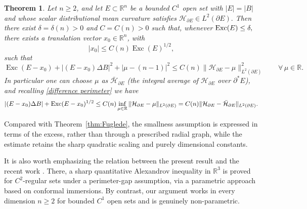\documentclass[reqno,11pt]{amsart}
\newcommand{\R}{\mathbb R}
\newtheorem{thm}{Theorem}[section]
\numberwithin{equation}{section}
\theoremstyle{remark}
\begin{document}
\begin{thm}\label{main thm}
Let $n \geq 2$, and let $E\subset \mathbb R^n$ be a bounded $C^1$ open set with $|E|=|B|$ and whose scalar distributional
mean curvature satisfies $\mathcal H_{\partial E}\in L^2(\partial E).$ Then there exist $\delta=\delta(n)>0$ and $C=C(n)>0$ such that, whenever
${\rm Exc}(E) \leq \delta,$
there exists a translation vector $x_0\in\R^n$, with
$$
|x_0|\le C(n)\operatorname{Exc}(E)^{1/2},
$$
such that
\begin{equation}
\label{eq:main thm}
\operatorname{Exc}(E-x_0)+|(E-x_0)\Delta B|^2+|\mu-(n-1)|^2
\le C(n) \|\mathcal H_{\partial E}-\mu\|^2_{L^2(\partial E)} \qquad \forall\,\mu \in \R.
\end{equation}
In particular  one can choose $\mu$ as $\bar {\mathcal H}_{\partial E}$ (the integral average of $\mathcal H_{\partial E}$ over ${\partial^* E}$), and recalling \eqref{difference perimeter} we have
$$|(E-x_0)\Delta B |+{\rm Exc}(E-x_0)^{1/2} \le C(n) \inf_{\mu\in \mathbb R}\|\mathcal H_{\partial E}-\mu\|_{L^2(\partial E)}=C(n) \|\mathcal H_{\partial E}-\bar {\mathcal H}_{\partial E}\|_{L^2(\partial E)}.$$
\end{thm}

Compared with Theorem~\ref{thm:Fuglede}, the smallness assumption is expressed in terms of the excess, rather than through a prescribed radial graph, while the estimate retains the sharp quadratic scaling and purely dimensional constants. 

It is also worth emphasizing the relation between the present result and the recent work \cite{JMOS2025}. There, a sharp quantitative Alexandrov inequality in $\mathbb R^3$ is proved for $C^2$-regular sets under a perimeter-gap assumption, via a parametric approach based on conformal immersions.  By contrast, our argument works in every dimension $n\ge 2$ for bounded $C^1$ open sets and is genuinely non-parametric. 
\end{document}
